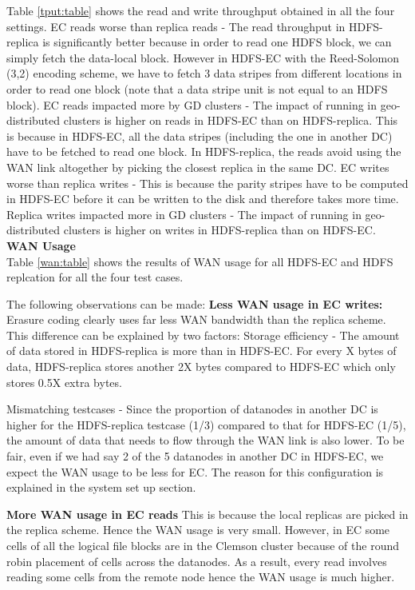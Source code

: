 \documentclass{sig-alternate-05-2015}
\begin{document}
Table \ref{tput:table} shows the read and write throughput obtained in all the four settings. EC reads worse than replica reads - The read throughput in HDFS-replica is significantly better because in order to read one HDFS block, we can simply fetch the data-local block. However in HDFS-EC with the Reed-Solomon (3,2) encoding scheme, we have to fetch 3 data stripes from different locations in order to read one block (note that a data stripe unit is not equal to an HDFS block). 
EC reads impacted more by GD clusters - The impact of running in geo-distributed clusters is higher on reads in HDFS-EC than on HDFS-replica. This is because in HDFS-EC, all the data stripes (including the one in another DC) have to be fetched to read one block. In HDFS-replica, the reads avoid using the WAN link altogether by picking the closest replica in the same DC.
EC writes worse than replica writes - This is because the parity stripes have to be computed in HDFS-EC before it can be written to the disk and therefore takes more time.
Replica writes impacted more in GD clusters - The impact of running in geo-distributed clusters is higher on writes in HDFS-replica than on HDFS-EC. \\

\textbf{WAN Usage} \\

Table \ref{wan:table} shows the results of WAN usage for all HDFS-EC and HDFS replcation for all the four test cases. 

The following observations can be made:
\textbf{Less WAN usage in EC writes:} Erasure coding clearly uses far less WAN bandwidth than the replica scheme. This difference can be explained by two factors:
Storage efficiency - The amount of data stored in HDFS-replica is more than in HDFS-EC. For every X bytes of data, HDFS-replica stores another 2X bytes compared to HDFS-EC which only stores 0.5X extra bytes.


Mismatching testcases - Since the proportion of datanodes in another DC is higher for the HDFS-replica testcase (1/3) compared to that for HDFS-EC (1/5), the amount of data that needs to flow through the WAN link is also lower. To be fair, even if we had say 2 of the 5 datanodes in another DC in HDFS-EC, we expect the WAN usage to be less for EC. The reason for this configuration is explained in the system set up section. 


\textbf{More WAN usage in EC reads} This is because the local replicas are picked in the replica scheme. Hence the WAN usage is very small.  However, in EC some cells of all the logical file blocks are in the Clemson cluster because of the round robin placement of cells across the datanodes. As a result, every read involves reading some cells from the remote node hence the WAN usage is much higher. 
\end{document}
